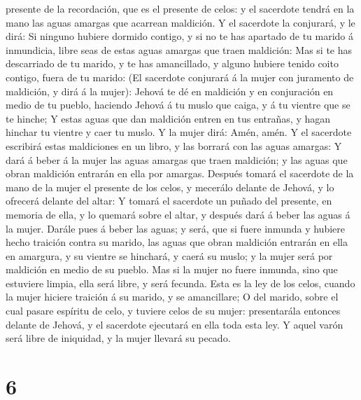 presente de la recordación, que es el presente de celos: y el sacerdote
tendrá en la mano las aguas amargas que acarrean maldición.
 Y el sacerdote la conjurará, y le dirá: Si ninguno hubiere
dormido contigo, y si no te has apartado de tu marido á inmundicia,
libre seas de estas aguas amargas que traen maldición:  Mas
si te has descarriado de tu marido, y te has amancillado, y alguno
hubiere tenido coito contigo, fuera de tu marido:  (El
sacerdote conjurará á la mujer con juramento de maldición, y dirá á la
mujer): Jehová te dé en maldición y en conjuración en medio de tu
pueblo, haciendo Jehová á tu muslo que caiga, y á tu vientre que se te
hinche;  Y estas aguas que dan maldición entren en tus
entrañas, y hagan hinchar tu vientre y caer tu muslo. Y la mujer dirá:
Amén, amén.  Y el sacerdote escribirá estas maldiciones en
un libro, y las borrará con las aguas amargas:  Y dará á
beber á la mujer las aguas amargas que traen maldición; y las aguas que
obran maldición entrarán en ella por amargas.  Después
tomará el sacerdote de la mano de la mujer el presente de los celos, y
mecerálo delante de Jehová, y lo ofrecerá delante del altar:
 Y tomará el sacerdote un puñado del presente, en memoria
de ella, y lo quemará sobre el altar, y después dará á beber las aguas á
la mujer.  Darále pues á beber las aguas; y será, que si
fuere inmunda y hubiere hecho traición contra su marido, las aguas que
obran maldición entrarán en ella en amargura, y su vientre se hinchará,
y caerá su muslo; y la mujer será por maldición en medio de su pueblo.
 Mas si la mujer no fuere inmunda, sino que estuviere
limpia, ella será libre, y será fecunda.  Esta es la ley de
los celos, cuando la mujer hiciere traición á su marido, y se
amancillare;  O del marido, sobre el cual pasare espíritu
de celo, y tuviere celos de su mujer: presentarála entonces delante de
Jehová, y el sacerdote ejecutará en ella toda esta ley.  Y
aquel varón será libre de iniquidad, y la mujer llevará su pecado.

\hypertarget{section-5}{%
\section{6}\label{section-5}}

